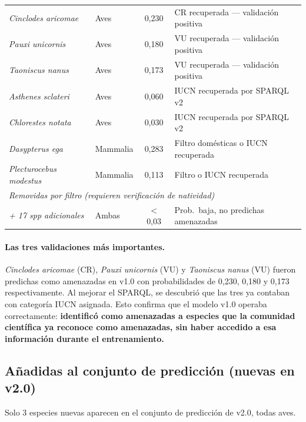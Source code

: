 \documentclass[12pt,a4paper]{article}
\begin{document}
\begin{table}[H]
\begin{tabular}{p{4.5cm}lcp{4.5cm}}
    \rowcolor{verdeClaro}\textit{Cinclodes aricomae} & Aves & 0,230 & CR recuperada --- validación positiva \\
    \rowcolor{verdeClaro}\textit{Pauxi unicornis}  & Aves & 0,180 & VU recuperada --- validación positiva \\
    \rowcolor{verdeClaro}\textit{Taoniscus nanus}  & Aves & 0,173 & VU recuperada --- validación positiva \\
    \rowcolor{verdeClaro}\textit{Asthenes sclateri}& Aves & 0,060 & IUCN recuperada por SPARQL v2 \\
    \rowcolor{verdeClaro}\textit{Chlorestes notata}& Aves & 0,030 & IUCN recuperada por SPARQL v2 \\
    \rowcolor{verdeClaro}\textit{Dasypterus ega}   & Mammalia & 0,283 & Filtro domésticas o IUCN recuperada \\
    \rowcolor{verdeClaro}\textit{Plecturocebus modestus} & Mammalia & 0,113 & Filtro o IUCN recuperada \\
    \midrule
    \multicolumn{4}{l}{\textit{Removidas por filtro (requieren verificación de natividad)}} \\
    \rowcolor{ambarClaro}\textit{+ 17 spp adicionales} & Ambas & $<$0,03 & Prob.\ baja, no predichas amenazadas \\
    \bottomrule
  \end{tabular}
\end{table}

\paragraph{Las tres validaciones más importantes.}
\textit{Cinclodes aricomae} (CR), \textit{Pauxi unicornis} (VU) y \textit{Taoniscus nanus} (VU)
fueron predichas como amenazadas en v1.0 con probabilidades de 0,230, 0,180 y 0,173
respectivamente.  Al mejorar el SPARQL, se descubrió que las tres ya contaban con categoría
IUCN asignada.  Esto confirma que el modelo v1.0 operaba correctamente: \textbf{identificó
como amenazadas a especies que la comunidad científica ya reconoce como amenazadas, sin
haber accedido a esa información durante el entrenamiento.}

\subsection{Añadidas al conjunto de predicción (nuevas en v2.0)}

Solo 3 especies nuevas aparecen en el conjunto de predicción de v2.0, todas aves.
\end{document}
